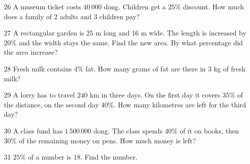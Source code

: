 \gap
\begin{probbox}{26}{\relax}
A museum ticket costs $40\,000$ dong. Children get a $25\%$ discount. How much does a family of $2$ adults and $3$ children pay?
\end{probbox}
\gap
\begin{probbox}{27}{\relax}
A rectangular garden is $25$ m long and $16$ m wide. The length is increased by $20\%$ and the width stays the same. Find the new area. By what percentage did the area increase?
\end{probbox}
\gap
\begin{probbox}{28}{\relax}
Fresh milk contains $4\%$ fat. How many grams of fat are there in $3$ kg of fresh milk?
\end{probbox}
\gap
\begin{probbox}{29}{\relax}
A lorry has to travel $240$ km in three days. On the first day it covers $35\%$ of the distance, on the second day $40\%$. How many kilometres are left for the third day?
\end{probbox}
\gap
\begin{probbox}{30}{\relax}
A class fund has $1\,500\,000$ dong. The class spends $40\%$ of it on books, then $30\%$ of the remaining money on pens. How much money is left?
\end{probbox}
\begin{probbox}{31}{}
$25\%$ of a number is $18$. Find the number.
\end{probbox}
